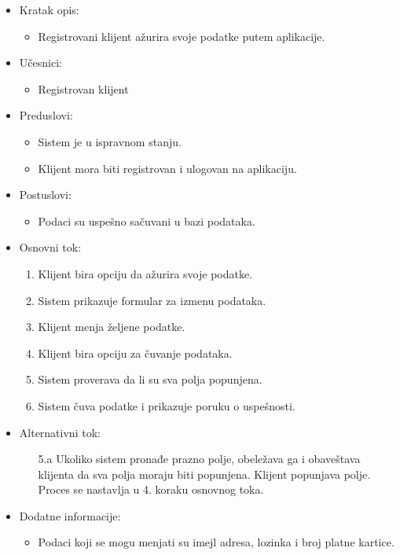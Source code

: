 \begin{itemize}
    \item Kratak opis:
        \begin{itemize}
            \item Registrovani klijent ažurira svoje podatke putem aplikacije.
        \end{itemize}
    \item Učesnici:
        \begin{itemize}
            \item Registrovan klijent
        \end{itemize}
    \item Preduslovi:
        \begin{itemize}
            \item Sistem je u ispravnom stanju.
            \item Klijent mora biti registrovan i ulogovan na aplikaciju.
        \end{itemize}
    \item Postuslovi:
        \begin{itemize}
            \item Podaci su uspešno sačuvani u bazi podataka.
        \end{itemize}
    \item Osnovni tok:
        \begin{enumerate}
            \item Klijent bira opciju da ažurira svoje podatke.
            \item Sistem prikazuje formular za izmenu podataka.
            \item Klijent menja željene podatke. 
            \item Klijent bira opciju za čuvanje podataka.
            \item Sistem proverava da li su sva polja popunjena.
            \item Sistem čuva podatke i prikazuje poruku o uspešnosti.
        \end{enumerate}
    \item Alternativni tok:
        \begin{itemize}
            \item[5.a] Ukoliko sistem pronađe prazno polje, obeležava ga i obaveštava klijenta da sva polja moraju biti popunjena. Klijent popunjava polje. Proces se nastavlja u 4. koraku osnovnog toka.
        \end{itemize}
    \item Dodatne informacije:
        \begin{itemize}
            \item Podaci koji se mogu menjati su imejl adresa, lozinka i broj platne kartice.
        \end{itemize}
\end{itemize}

